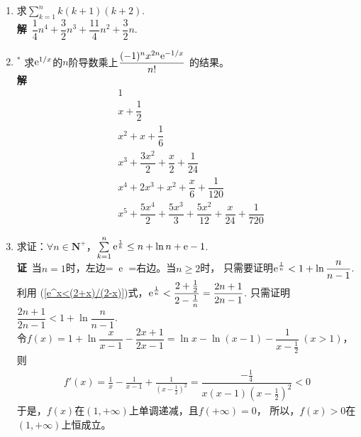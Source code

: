 \begin{enumerate}[label={\textbf{\arabic*.}},leftmargin=
    \inteval{\myenumleftmargin}pt]
\item 求$ \sum\limits_{k=1}^n k(k+1)(k+2) $.
\ifteach \\ \textbf{解}\ 
$ \dfrac{1}{4}n^4+\dfrac{3}{2}n^3+\dfrac{11}{4}n^2+\dfrac{3}{2}n $.
\fi

\item $ ^* $ 求$ \mathrm{e}^{1/x} $的$ n $阶导数乘上$ \dfrac{(-1)^nx^{2n}\mathrm{e}^{-1/x}}{n!} $
的结果。
\ifteach \\
\textbf{解}\ 
\begin{align*}
    & 1                                             \\
    & x+\dfrac{1}{2}                                \\
    & x^2+x+\dfrac{1}{6}                            \\
    & x^3+\dfrac{3x^2}{2}+\dfrac{x}{2}+\dfrac{1}{24}\\
    & x^4+2x^3+x^2+\dfrac{x}{6}+\dfrac{1}{120}		\\	
    & x^5+\dfrac{5x^4}{2}+\dfrac{5x^3}{3}+\dfrac{5x^2}{12}+
    \dfrac{x}{24}+\dfrac{1}{720}
\end{align*} 
\fi

\item 求证：$ \forall n\in \textbf{N}^+ $，$ \sum\limits_{k=1}^{n} 
\mathrm{e}^{\frac{1}{k}}\leq n+\ln n+\mathrm{e} -1 $. \\
\textbf{证}\ 当$ n=1 $时，左边=\ $ \mathrm{e} $\ =右边。当$ n\geq 2 $时，
只需要证明$ \mathrm{e}^{\frac{1}{n}}<1+\ln \dfrac{n}{n-1} $. 利用
(\ref{e^x<(2+x)/(2-x)})式，$ \mathrm{e}^{\frac{1}{n}}<\dfrac{2+
    \frac{1}{2}}{2-\frac{1}{n}}=\dfrac{2n+1}{2n-1} $.
只需证明$ \dfrac{2n+1}{2n-1}<1+\ln \dfrac{n}{n-1} $. \\
令$ f(x)=1+\ln \dfrac{x}{x-1}-\dfrac{2x+1}{2x-1}=
\ln x-\ln(x-1)-\dfrac{1}{x-\frac{1}{2}}\ (x>1) $，则
\begin{align*}
    f'(x)=\frac{1}{x}-\frac{1}{x-1}+\frac{1}{(x-\frac{1}{2})^2}
    =\dfrac{-\frac{1}{4}}{x(x-1)(x-\frac{1}{2})^2}<0
\end{align*}
于是，$ f(x) $在$ (1,+\infty) $上单调递减，且$ f(+\infty)=0 $，
所以，$ f(x)>0 $在$ (1,+\infty) $上恒成立。


\end{enumerate}
